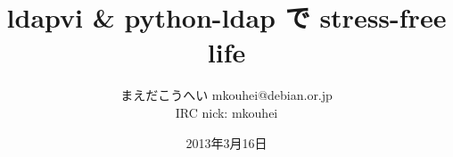 




\documentclass[cjk,dvipdfmx,12pt]{beamer}
\usepackage{monthlypresentation}



\title{ldapvi \& python-ldap で stress-free life}
\author{まえだこうへい mkouhei@debian.or.jp\\IRC nick: mkouhei}
\date{2013年3月16日}



